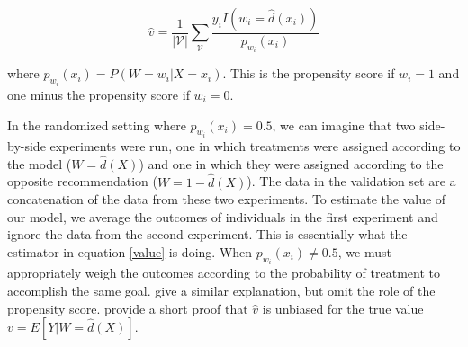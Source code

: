 \begin{equation}
\label{value}
\hat v = \frac{1}{|\mathcal{V}|}\sum_{\mathcal{V}} \frac{y_i I(w_i=\hat d(x_i))}{p_{w_i}(x_i)}
\end{equation}

where $p_{w_i}(x_i) = P(W=w_i | X=x_i)$. This is the propensity score if $w_i = 1$ and one minus the propensity score if $w_i = 0$.

In the randomized setting where $p_{w_i}(x_i) = 0.5$, we can imagine that two side-by-side experiments were run, one in which treatments were assigned according to the model ($W = \hat d(X)$) and one in which they were assigned according to the opposite recommendation ($W = 1 - \hat d(X)$). The data in the validation set are a concatenation of the data from these two experiments. To estimate the value of our model, we average the outcomes of individuals in the first experiment and ignore the data from the second experiment. This is essentially what the estimator in equation \ref{value} is doing. When $p_{w_i}(x_i) \ne 0.5$, we must appropriately weigh the outcomes according to the probability of treatment to accomplish the same goal. \citet{Kapelner:3baXYEjR} give a similar explanation, but omit the role of the propensity score. \citet{Zhao:2017wa} provide a short proof that $\hat v$ is unbiased for the true value $v = E[Y|W = \hat d(X)]$. 
